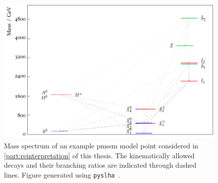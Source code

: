 \begin{figure}
	\centering\includegraphics[width=.8\textwidth]{slha}
	\caption{Mass spectrum of an example \gls{pmssm} model point considered in \cref{part:reinterpretation} of this thesis. The kinematically allowed decays and their branching ratios are indicated through dashed lines. Figure generated using \texttt{pyslha}~\cite{pyslha:2013jua}.}\label{fig:slha}
\end{figure}




